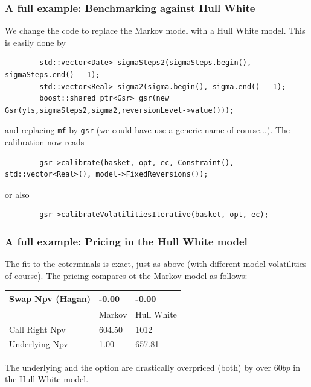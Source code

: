 \documentclass{beamer}
\begin{document}
\begin{frame}[fragile]
\frametitle{A full example: Benchmarking against Hull White}
We change the code to replace the Markov model with a Hull White model. This is easily done by
\begin{verbatim}
        std::vector<Date> sigmaSteps2(sigmaSteps.begin(), sigmaSteps.end() - 1);
        std::vector<Real> sigma2(sigma.begin(), sigma.end() - 1);
        boost::shared_ptr<Gsr> gsr(new Gsr(yts,sigmaSteps2,sigma2,reversionLevel->value()));
\end{verbatim}
and replacing \verb+mf+ by \verb+gsr+ (we could have use a generic name of course...). The calibration now reads
\begin{verbatim}
        gsr->calibrate(basket, opt, ec, Constraint(), std::vector<Real>(), model->FixedReversions());
\end{verbatim}
or also
\begin{verbatim}
        gsr->calibrateVolatilitiesIterative(basket, opt, ec);
\end{verbatim}

\end{frame}


\begin{frame}[fragile]
\frametitle{A full example: Pricing in the Hull White model}

The fit to the coterminals is exact, just as above (with different model volatilities of course).
The pricing compares ot the Markov model as follows:
\begin{table}[ht]
\begin{tabular}{l|l|l}
Swap Npv (Hagan) & -0.00 & -0.00\\ \hline
 & Markov & Hull White \\ \hline
Call Right Npv   & 604.50 & 1012\\
Underlying Npv   & 1.00 & 657.81\\
\end{tabular}
\end{table}

The underlying and the option are drastically overpriced (both)  by over $60 bp$ in the Hull White model.
\end{frame}
\end{document}
